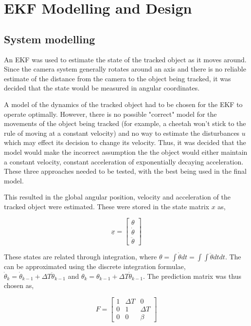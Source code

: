 \chapter{EKF Modelling and Design}

\section{System modelling}
An EKF was used to estimate the state of the tracked object as it moves around. Since the camera system generally rotates around an axis and there is no reliable estimate of the distance from the camera to the object being tracked, it was decided that the state would be measured in angular coordinates.

A model of the dynamics of the tracked object had to be chosen for the EKF to operate optimally. However, there is no possible "correct" model for the movements of the object being tracked (for example, a cheetah won't stick to the rule of moving at a constant velocity) and no way to estimate the disturbances $u$ which may effect its decision to change its velocity. Thus, it was decided that the model would make the incorrect assumption the the object would either maintain a constant velocity, constant acceleration of exponentially decaying acceleration. These three approaches needed to be tested, with the best being used in the final model.

This resulted in the global angular position, velocity and acceleration of the tracked object were estimated. These were stored in the state matrix $x$ as,

\[ \underline{x} = \begin{bmatrix} \theta \\ \dot{\theta} \\ \ddot{\theta} \end{bmatrix} \]

These states are related through integration, where $\theta = \int{\dot{\theta} dt} = \int{\int{\ddot{\theta} dt}dt}$. The can be approximated using the discrete integration formulae, $\dot{\theta}_k = \dot{\theta}_{k-1} + \Delta T \ddot{\theta}_{k-1}$ and $\theta_k = \theta_{k-1} + \Delta T \dot{\theta}_{k-1}$. The prediction matrix was thus chosen as,

\[ F = \begin{bmatrix} 1 & \Delta T & 0 \\
                       0 & 1 & \Delta T \\
					   0 & 0 & \beta
		\end{bmatrix} \]

